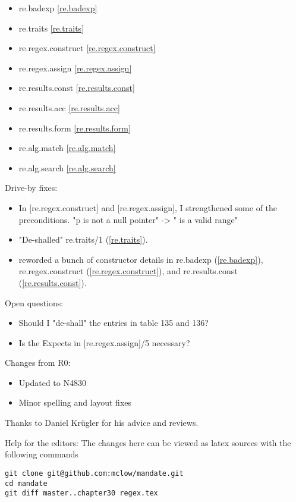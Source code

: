 \begin{multicols}{2}
\begin{itemize}
\item{re.badexp}			\ref{re.badexp}
\item{re.traits}			\ref{re.traits}
\item{re.regex.construct}	\ref{re.regex.construct}
\item{re.regex.assign}		\ref{re.regex.assign}
\item{re.results.const}		\ref{re.results.const}
\item{re.results.acc}		\ref{re.results.acc}
\item{re.results.form}		\ref{re.results.form}
\item{re.alg.match}			\ref{re.alg.match}
\item{re.alg.search}		\ref{re.alg.search}
\end{itemize}
\end{multicols}

Drive-by fixes:
\begin{itemize}
\item{In [re.regex.construct] and [re.regex.assign], I strengthened some of the preconditions. "p is not a null pointer" -> " is a valid range"}
\item{"De-shalled" re.traits/1 (\ref{re.traits}).}
\item{reworded a bunch of constructor details in re.badexp (\ref{re.badexp}),  re.regex.construct (\ref{re.regex.construct}), and re.results.const (\ref{re.results.const}).}
\end{itemize}

Open questions:
\begin{itemize}
\item{Should I "de-shall" the entries in table 135 and 136?}
\item{Is the Expects in [re.regex.assign]/5 necessary?}
\end{itemize}


Changes from R0:
\begin{itemize}
\item{Updated to N4830}
\item{Minor spelling and layout fixes}
\end{itemize}

Thanks to Daniel Krügler for his advice and reviews.

\vfill
Help for the editors: The changes here can be viewed as latex sources with the following commands
\begin{verbatim}
git clone git@github.com:mclow/mandate.git
cd mandate
git diff master..chapter30 regex.tex
\end{verbatim}
